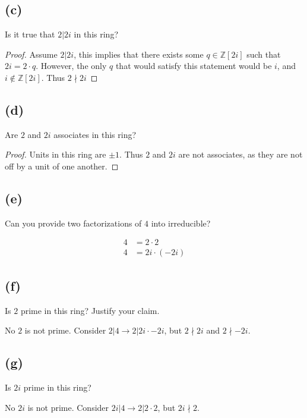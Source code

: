 \documentclass[10pt]{armath}
\newcommand{\zi}{\mathbb{Z}\left[2i\right]}
\begin{document}
\subsection*{(c)}%
\label{sub:_c_}

Is it true that $2|2i$ in this ring?

\begin{proof}
  Assume $2|2i$, this implies that there exists some $q\in\zi$ such that
  $2i=2\cdot q$. However, the only $q$ that would satisfy this statement would
  be $i$, and $i\notin\zi$. Thus $2\nmid2i$
\end{proof}

\subsection*{(d)}%
\label{sub:_d_}

Are $2$ and $2i$ associates in this ring?

\begin{proof}
  Units in this ring are $\pm 1$. Thus $2$ and $2i$ are not associates, as
  they are not off by a unit of one another.
\end{proof}

\subsection*{(e)}%
\label{sub:_e_}

Can you provide two factorizations of $4$ into irreducible?

\begin{align*}
  4&=2\cdot 2\\
  4&=2i\cdot(-2i)
\end{align*}

\subsection*{(f)}%
\label{sub:_f_}

Is $2$ prime in this ring? Justify your claim.

No $2$ is not prime. Consider $2|4\rightarrow2|2i\cdot-2i$, but $2\nmid2i$ and
$2\nmid -2i$.

\subsection*{(g)}%
\label{sub:_g_}

Is $2i$ prime in this ring?

No $2i$ is not prime. Consider $2i|4\rightarrow2|2\cdot2$, but $2i\nmid 2$.
\end{document}
